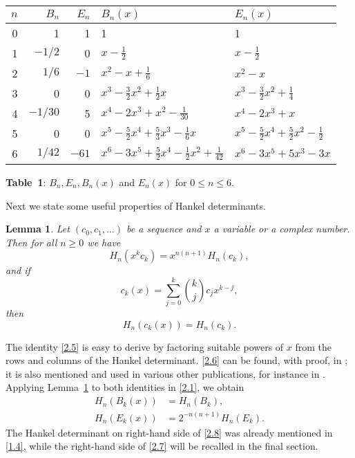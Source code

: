 \documentclass{amsart}
\theoremstyle{plain}
\newtheorem{lemma}[theorem]{Lemma}
\numberwithin{equation}{section}
\begin{document}
\bigskip
\begin{center}
\renewcommand*{\arraystretch}{1.2}
\begin{tabular}{|r||r|r|l|l|}
\hline
$n$ & $B_n$ & $E_n$ & $B_n(x)$ & $E_n(x)$\\
\hline
0 & 1 & 1 &  1 & 1 \\
1 & $-1/2$ & 0 & $x-\tfrac{1}{2}$ & $x-\tfrac{1}{2}$ \\
2 & $1/6$ & $-1$  & $x^2-x+\tfrac{1}{6}$ & $x^2-x$ \\
3 & 0 & 0 & $x^3-\tfrac{3}{2}x^2+\tfrac{1}{2}x$ & $x^3-\tfrac{3}{2}x^2+\tfrac{1}{4}$ \\
4 & $-1/30$ & 5 & $x^4-2x^3+x^2-\tfrac{1}{30}$ & $x^4-2x^3+x$ \\
5 & 0 & 0 & $x^5-\tfrac{5}{2}x^4+\tfrac{5}{3}x^3-\tfrac{1}{6}x$ &
$x^5-\tfrac{5}{2}x^4+\tfrac{5}{2}x^2-\tfrac{1}{2}$ \\
6 & $1/42$ & $-61$ & $x^6-3x^5+\tfrac{5}{2}x^4-\tfrac{1}{2}x^2+\tfrac{1}{42}$ &
$x^6-3x^5+5x^3-3x$ \\
\hline
\end{tabular}

\medskip
{\bf Table~1}: $B_n, E_n, B_n(x)$ and $E_n(x)$ for $0\leq n\leq 6$.
\end{center}
\bigskip

Next we state some useful properties of Hankel determinants.

\begin{lemma}\label{lem:2.1}
Let $(c_0, c_1,\ldots)$ be a sequence and $x$ a variable or a complex number. 
Then for all $n\geq 0$ we have
\begin{equation}\label{2.5}
H_n(x^kc_k) = x^{n(n+1)}H_n(c_k),
\end{equation}
and if
\[
c_k(x) = \sum_{j=0}^k\binom{k}{j}c_jx^{k-j},
\]
then
\begin{equation}\label{2.6}
H_n(c_k(x)) = H_n(c_k).
\end{equation}
\end{lemma}

The identity \eqref{2.5} is easy to derive by factoring suitable powers of $x$
from the rows and columns of the Hankel determinant. \eqref{2.6} can be found,
with proof, in \cite{Ju}; it is also mentioned and used in various other 
publications, for instance in \cite[Lemma~15]{Kr}. Applying Lemma~\ref{lem:2.1}
to both identities in \eqref{2.1}, we obtain
\begin{align}
H_n(B_k(x)) &= H_n(B_k),\label{2.7}\\
H_n(E_k(x)) &= 2^{-n(n+1)}H_n(E_k).\label{2.8}
\end{align}
The Hankel determinant on right-hand side of \eqref{2.8} was already mentioned 
in \eqref{1.4}, while the right-hand side of \eqref{2.7} will be recalled in the
final section.
\end{document}
